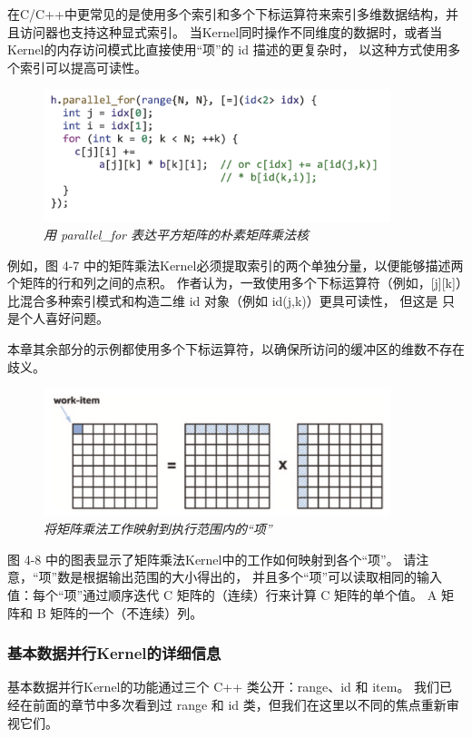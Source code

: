 在C/C++中更常见的是使用多个索引和多个下标运算符来索引多维数据结构，并且访问器也支持这种显式索引。 
当Kernel同时操作不同维度的数据时，或者当Kernel的内存访问模式比直接使用“项”的 id 描述的更复杂时，
以这种方式使用多个索引可以提高可读性。

\begin{figure}[H]
	\centering
	\includegraphics[width=0.9\textwidth]{figs/F4.7.png}
	\caption{\textit{用 parallel\_for 表达平方矩阵的朴素矩阵乘法核}}
\end{figure}

例如，图 4-7 中的矩阵乘法Kernel必须提取索引的两个单独分量，以便能够描述两个矩阵的行和列之间的点积。 
作者认为，一致使用多个下标运算符（例如，[j][k]）比混合多种索引模式和构造二维 id 对象（例如 id(j,k)）更具可读性，
但这是 只是个人喜好问题。

本章其余部分的示例都使用多个下标运算符，以确保所访问的缓冲区的维数不存在歧义。

\begin{figure}[H]
	\centering
	\includegraphics[width=0.9\textwidth]{figs/F4.8.png}
	\caption{\textit{将矩阵乘法工作映射到执行范围内的“项”}}
\end{figure}

图 4-8 中的图表显示了矩阵乘法Kernel中的工作如何映射到各个“项”。 
请注意，“项”数是根据输出范围的大小得出的，
并且多个“项”可以读取相同的输入值：每个“项”通过顺序迭代 C 矩阵的（连续）行来计算 C 矩阵的单个值。 
A 矩阵和 B 矩阵的一个（不连续）列。

\subsubsection{基本数据并行Kernel的详细信息}
基本数据并行Kernel的功能通过三个 C++ 类公开：range、id 和 item。 
我们已经在前面的章节中多次看到过 range 和 id 类，但我们在这里以不同的焦点重新审视它们。


